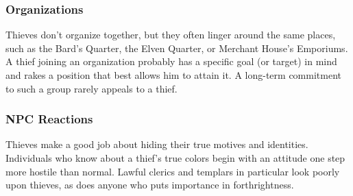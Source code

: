 \subsubsection{Organizations}
Thieves don't organize together, but they often linger around the same places, such as the Bard's Quarter, the Elven Quarter, or Merchant House's Emporiums. A thief joining an organization probably has a specific goal (or target) in mind and rakes a position that best allows him to attain it. A long-term commitment to such a group rarely appeals to a thief.

\subsubsection{NPC Reactions}
Thieves make a good job about hiding their true motives and identities. Individuals who know about a thief's true colors begin with an attitude one step more hostile than normal. Lawful clerics and templars in particular look poorly upon thieves, as does anyone who puts importance in forthrightness.




